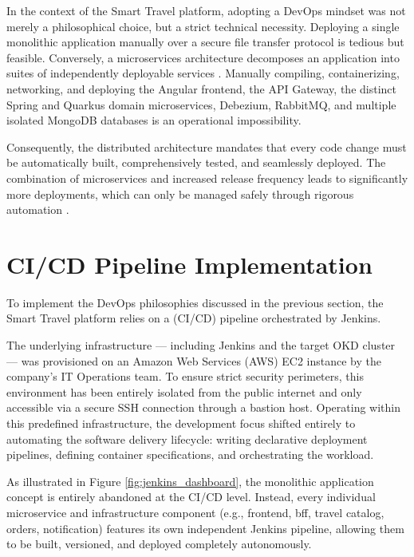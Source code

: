 In the context of the Smart Travel platform, adopting a DevOps mindset was not merely a philosophical choice, but a strict technical necessity. Deploying a single monolithic application manually over a secure file transfer protocol is tedious but feasible. Conversely, a microservices architecture decomposes an application into suites of independently deployable services \cite{fowler_microservices}. Manually compiling, containerizing, networking, and deploying the Angular frontend, the API Gateway, the distinct Spring and Quarkus domain microservices, Debezium, RabbitMQ, and multiple isolated MongoDB databases is an operational impossibility. 

Consequently, the distributed architecture mandates that every code change must be automatically built, comprehensively tested, and seamlessly deployed. The combination of microservices and increased release frequency leads to significantly more deployments, which can only be managed safely through rigorous automation \cite{aws_what_is_devops}.


\section{CI/CD Pipeline Implementation}
\label{sec:ci_cd}

To implement the DevOps philosophies discussed in the previous section, the Smart Travel platform relies on a (\gls{CI/CD}) pipeline orchestrated by Jenkins. 

The underlying infrastructure — including Jenkins and the target OKD cluster — was provisioned on an Amazon Web Services (AWS) EC2 instance by the company's IT Operations team. To ensure strict security perimeters, this environment has been entirely isolated from the public internet and only accessible via a secure SSH connection through a bastion host. Operating within this predefined infrastructure, the development focus shifted entirely to automating the software delivery lifecycle: writing declarative deployment pipelines, defining container specifications, and orchestrating the workload.

As illustrated in Figure \ref{fig:jenkins_dashboard}, the monolithic application concept is entirely abandoned at the CI/CD level. Instead, every individual microservice and infrastructure component (e.g., frontend, bff, travel catalog, orders, notification) features its own independent Jenkins pipeline, allowing them to be built, versioned, and deployed completely autonomously.

